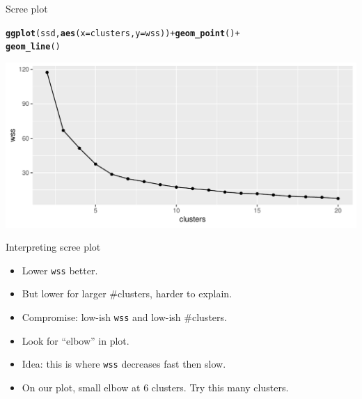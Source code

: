 \documentclass[unknownkeysallowed]{beamer}\usepackage[]{graphicx}\usepackage[]{color}
\makeatletter
\def\maxwidth{ %
  \ifdim\Gin@nat@width>\linewidth
    \linewidth
  \else
    \Gin@nat@width
  \fi
}
\newcommand{\hlopt}[1]{\textcolor[rgb]{0,0,0}{#1}}%
\newcommand{\hlstd}[1]{\textcolor[rgb]{0.345,0.345,0.345}{#1}}%
\newcommand{\hlkwc}[1]{\textcolor[rgb]{0.333,0.667,0.333}{#1}}%
\newcommand{\hlkwd}[1]{\textcolor[rgb]{0.737,0.353,0.396}{\textbf{#1}}}%
\newenvironment{kframe}{%
 \def\at@end@of@kframe{}%
 \ifinner\ifhmode%
  \def\at@end@of@kframe{\end{minipage}}%
  \begin{minipage}{\columnwidth}%
 \fi\fi%
 \def\FrameCommand##1{\hskip\@totalleftmargin \hskip-\fboxsep
 \colorbox{shadecolor}{##1}\hskip-\fboxsep
     \hskip-\linewidth \hskip-\@totalleftmargin \hskip\columnwidth}%
 \MakeFramed {\advance\hsize-\width
   \@totalleftmargin\z@ \linewidth\hsize
   \@setminipage}}%
 {\par\unskip\endMakeFramed%
 \at@end@of@kframe}
\newenvironment{knitrout}{}{} %
\makeatother
\begin{document}
\begin{frame}[fragile]{Scree plot}

\begin{knitrout}
\color{fgcolor}\begin{kframe}
\begin{alltt}
\hlkwd{ggplot}\hlstd{(ssd,}\hlkwd{aes}\hlstd{(}\hlkwc{x}\hlstd{=clusters,}\hlkwc{y}\hlstd{=wss))}\hlopt{+}\hlkwd{geom_point}\hlstd{()}\hlopt{+}
  \hlkwd{geom_line}\hlstd{()}
\end{alltt}
\end{kframe}
\includegraphics[width=\maxwidth]{figure/favalli-1} 

\end{knitrout}
  
\end{frame}

\begin{frame}[fragile]{Interpreting scree plot}
  
  \begin{itemize}
  \item Lower \texttt{wss} better.
  \item But lower for larger \#clusters, harder to explain.
  \item Compromise: low-ish \texttt{wss} and low-ish \#clusters.
  \item Look for ``elbow'' in plot.
  \item Idea: this is where \texttt{wss} decreases fast then slow.
  \item On our plot, small elbow at 6 clusters. Try this many clusters.
  \end{itemize}
  
\end{frame}
\end{document}
